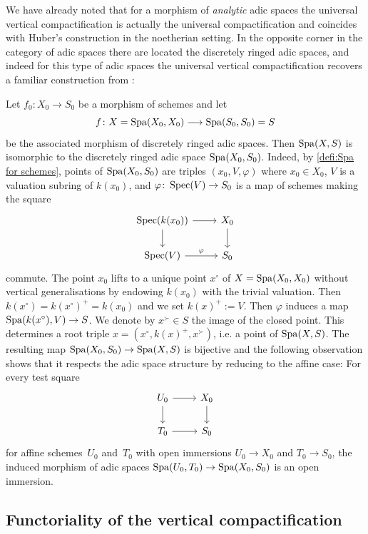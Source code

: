We have already noted that for a morphism of \emph{analytic} adic spaces the universal vertical compactification is actually the universal compactification and coincides with Huber's construction in the noetherian setting.
In the opposite corner in the category of adic spaces there are located the discretely ringed adic spaces, and indeed for this type of adic spaces the universal vertical compactification recovers a familiar construction from \cite[\S~3.1]{Temkin2011:RelativeRiemannZariskiSpacesa}:


\begin{ex} \label{example-Spa-schemes}
        Let $f_0\colon X_0\to S_0$ be a morphism of schemes and let 
    \[
        f\colon X=\operatorname{Spa}(X_0, X_0)\longrightarrow \operatorname{Spa}(S_0, S_0)=S
    \]
    be the associated morphism of discretely ringed adic spaces. Then $\operatorname{Spa}(X, S)$ is isomorphic to the discretely ringed adic space $\operatorname{Spa}(X_0, S_0)$.
    Indeed, by \cref{defi:Spa for schemes}, points of $\operatorname{Spa}(X_0, S_0)$ are triples $(x_0, V, \varphi)$ where $x_0\in X_0$, $V$ is a valuation subring of $k(x_0)$, and $\varphi \colon \operatorname{Spec}(V)\to S_0$ is a map of schemes making the square
\[ 
    \begin{tikzcd}
        \Spec(k(x_0)) \ar[r] \ar[d] & X_0 \ar[d] \\
        \Spec(V)\ar[r,"\varphi"] & S_0
    \end{tikzcd}
\]
commute.
The point $x_0$ lifts to a unique point $x^\circ$ of $X=\operatorname{Spa}(X_0, X_0)$ without vertical generalisations by endowing $k(x_0)$ with the trivial valuation.
Then $k(x^\circ) = k(x^\circ)^+ = k(x_0)$ and we set $k(x)^+ := V$.
Then $\varphi$ induces a map $\operatorname{Spa}(k(x^\circ), V)\to S$.
We denote by $x^\succ \in S$ the image of the closed point.
This determines a root triple $x = (x^\circ,k(x)^+,x^\succ)$, i.e. a point of $\operatorname{Spa}(X,S)$.
The resulting map $\operatorname{Spa}(X_0,S_0) \to \operatorname{Spa}(X,S)$ is bijective and the following observation shows that it respects the adic space structure by reducing to the affine case:
For every test square
\[
    \begin{tikzcd}
        U_0 \ar[r]  \ar[d]  & X_0   \ar[d] \\
        T_0 \ar[r]          & S_0
    \end{tikzcd}
\]
for affine schemes~$U_0$ and~$T_0$ with open immersions $U_0 \to X_0$ and $T_0 \to S_0$, the induced morphism of adic spaces $\operatorname{Spa}(U_0,T_0) \to \operatorname{Spa}(X_0,S_0)$ is an open immersion.
\end{ex}


\subsection{Functoriality of the vertical compactification}


